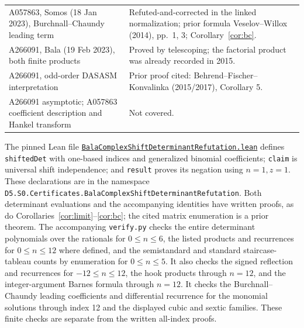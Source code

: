 \documentclass[11pt]{article}
\begin{document}
{\begin{longtable}{@{}>{\raggedright\arraybackslash}p{.45\linewidth}>{\raggedright\arraybackslash}p{.51\linewidth}@{}}
A057863, Somos (18 Jan 2023), Burchnall--Chaundy leading term & Refuted-and-corrected in the linked normalization; prior formula Veselov--Willox (2014), pp.~1, 3; Corollary~\ref{cor:bc}.\\
A266091, Bala (19 Feb 2023), both finite products & Proved by telescoping; the factorial product was already recorded in 2015.\\
A266091, odd-order DASASM interpretation & Prior proof cited: Behrend--Fischer--Konvalinka (2015/2017), Corollary 5.\\
A266091 asymptotic; A057863 coefficient description and Hankel transform & Not covered.\\
\bottomrule
\end{longtable}}
{\small\raggedright The pinned Lean file
\href{https://github.com/the-omega-institute/trureturing/blob/d73267bacb7cde6604fdaee3818fa517d9ced843/D5/S0/Certificates/BalaComplexShiftDeterminantRefutation.lean}{\texttt{BalaComplexShiftDeterminantRefutation.lean}}
defines \texttt{shiftedDet} with one-based indices and generalized binomial
coefficients; \texttt{claim} is universal shift independence; and
\texttt{result} proves its negation using $n=1,z=1$.
These declarations are in the namespace
\texttt{D5.S0.Certificates.}\allowbreak\texttt{BalaComplexShiftDeterminantRefutation}.
Both determinant evaluations and the accompanying identities have written
proofs, as do Corollaries~\ref{cor:limit}--\ref{cor:bc}; the cited matrix
enumeration is a prior theorem. The accompanying \texttt{verify.py} checks the entire
determinant polynomials over the rationals for $0\le n\le6$, the listed
products and recurrences for $0\le n\le12$ where defined, and the
semistandard and standard staircase-tableau counts by enumeration for
$0\le n\le5$. It also checks the signed reflection and recurrences for
$-12\le n\le12$, the hook products through $n=12$, and the
integer-argument Barnes formula through $n=12$. It checks the
Burchnall--Chaundy leading coefficients and differential recurrence for the
monomial solutions through index 12 and the displayed cubic and sextic
families. These finite checks are separate from the written all-index proofs.\par}
\end{document}
